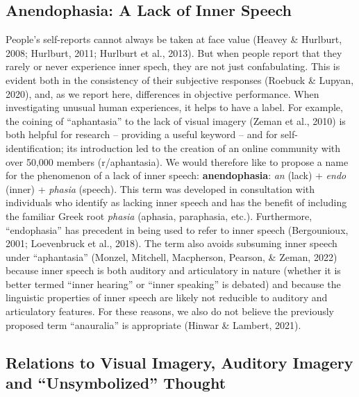 \documentclass[
  man,a4paper,floatsintext]{apa6}
\begin{document}
\hypertarget{anendophasia-a-lack-of-inner-speech}{%
\subsection{Anendophasia: A Lack of Inner Speech}\label{anendophasia-a-lack-of-inner-speech}}

People's self-reports cannot always be taken at face value (Heavey \& Hurlburt, 2008; Hurlburt, 2011; Hurlburt et al., 2013). But when people report that they rarely or never experience inner spech, they are not just confabulating. This is evident both in the consistency of their subjective responses (Roebuck \& Lupyan, 2020), and, as we report here, differences in objective performance. When investigating unusual human experiences, it helps to have a label. For example, the coining of ``aphantasia'' to the lack of visual imagery (Zeman et al., 2010) is both helpful for research -- providing a useful keyword -- and for self-identification; its introduction led to the creation of an online community with over 50,000 members (r/aphantasia).
We would therefore like to propose a name for the phenomenon of a lack of inner speech: \textbf{anendophasia}: \emph{an} (lack) + \emph{endo} (inner) + \emph{phasia} (speech). This term was developed in consultation with individuals who identify as lacking inner speech and has the benefit of including the familiar Greek root \emph{phasia} (aphasia, paraphasia, etc.). Furthermore, ``endophasia'' has precedent in being used to refer to inner speech (Bergounioux, 2001; Loevenbruck et al., 2018). The term also avoids subsuming inner speech under ``aphantasia'' (Monzel, Mitchell, Macpherson, Pearson, \& Zeman, 2022) because inner speech is both auditory and articulatory in nature (whether it is better termed ``inner hearing'' or ``inner speaking'' is debated) and because the linguistic properties of inner speech are likely not reducible to auditory and articulatory features. For these reasons, we also do not believe the previously proposed term ``anauralia'' is appropriate (Hinwar \& Lambert, 2021).

\hypertarget{relations-to-visual-imagery-auditory-imagery-and-unsymbolized-thought}{%
\subsection{Relations to Visual Imagery, Auditory Imagery and ``Unsymbolized'' Thought}\label{relations-to-visual-imagery-auditory-imagery-and-unsymbolized-thought}}
\end{document}

